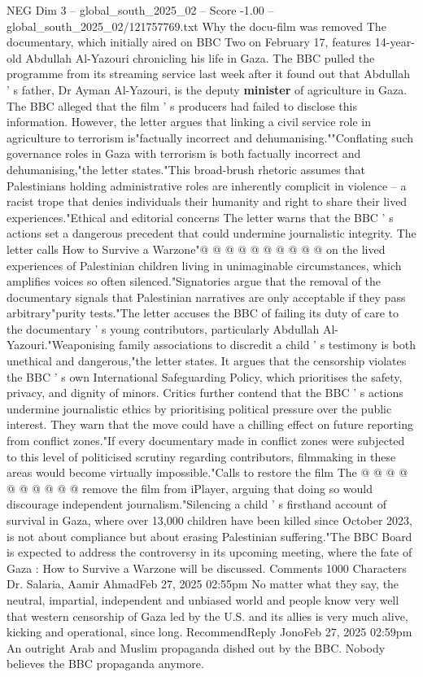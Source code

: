 \begin{textsample}{NEG Dim 3 – global\_south\_2025\_02 – Score -1.00 – global\_south\_2025\_02/121757769.txt}  \label{ex:f3_neg_001}
Why the docu-film was removed The documentary, which initially aired on BBC Two on February 17, features 14-year-old Abdullah Al-Yazouri chronicling his life in Gaza.
The BBC pulled the programme from its streaming service last week after it found out that Abdullah ' s father, Dr Ayman Al-Yazouri, is the deputy \textbf{minister} of agriculture in Gaza.
The BBC alleged that the film ' s producers had failed to disclose this information.
However, the letter argues that linking a civil service role in agriculture to terrorism is"factually incorrect and dehumanising.""Conflating such governance roles in Gaza with terrorism is both factually incorrect and dehumanising,"the letter states."This broad-brush rhetoric assumes that Palestinians holding administrative roles are inherently complicit in violence -- a racist trope that denies individuals their humanity and right to share their lived experiences."Ethical and editorial concerns The letter warns that the BBC ' s actions set a dangerous precedent that could undermine journalistic integrity.
The letter calls How to Survive a Warzone"@ @ @ @ @ @ @ @ @ @ on the lived experiences of Palestinian children living in unimaginable circumstances, which amplifies voices so often silenced."Signatories argue that the removal of the documentary signals that Palestinian narratives are only acceptable if they pass arbitrary"purity tests."The letter accuses the BBC of failing its duty of care to the documentary ' s young contributors, particularly Abdullah Al-Yazouri."Weaponising family associations to discredit a child ' s testimony is both unethical and dangerous,"the letter states.
It argues that the censorship violates the BBC ' s own International Safeguarding Policy, which prioritises the safety, privacy, and dignity of minors.
Critics further contend that the BBC ' s actions undermine journalistic ethics by prioritising political pressure over the public interest.
They warn that the move could have a chilling effect on future reporting from conflict zones."If every documentary made in conflict zones were subjected to this level of politicised scrutiny regarding contributors, filmmaking in these areas would become virtually impossible."Calls to restore the film The @ @ @ @ @ @ @ @ @ @ remove the film from iPlayer, arguing that doing so would discourage independent journalism."Silencing a child ' s firsthand account of survival in Gaza, where over 13,000 children have been killed since October 2023, is not about compliance but about erasing Palestinian suffering."The BBC Board is expected to address the controversy in its upcoming meeting, where the fate of Gaza : How to Survive a Warzone will be discussed.
Comments 1000 Characters Dr.
Salaria, Aamir AhmadFeb 27, 2025 02:55pm No matter what they say, the neutral, impartial, independent and unbiased world and people know very well that western censorship of Gaza led by the U.S. and its allies is very much alive, kicking and operational, since long.
RecommendReply JonoFeb 27, 2025 02:59pm An outright Arab and Muslim propaganda dished out by the BBC.
Nobody believes the BBC propaganda anymore.

\end{textsample}
